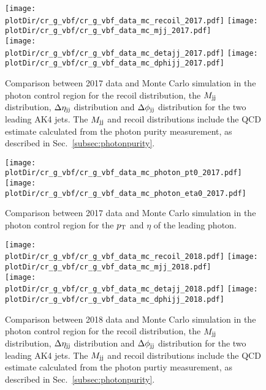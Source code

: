 \begin{figure}[htbp]
    \begin{center}
        \texttt{[image: \\plotDir/cr\_g\_vbf/cr\_g\_vbf\_data\_mc\_recoil\_2017.pdf]}
        \texttt{[image: \\plotDir/cr\_g\_vbf/cr\_g\_vbf\_data\_mc\_mjj\_2017.pdf]} \\
        \texttt{[image: \\plotDir/cr\_g\_vbf/cr\_g\_vbf\_data\_mc\_detajj\_2017.pdf]}
        \texttt{[image: \\plotDir/cr\_g\_vbf/cr\_g\_vbf\_data\_mc\_dphijj\_2017.pdf]}
    \end{center}
    \caption{Comparison between 2017 data and Monte Carlo simulation in the photon control region for
        the recoil distribution, the $M_{\textrm{jj}}$ distribution, $\Delta \eta_{\textrm{jj}}$ distribution and $\Delta \phi_{\textrm{jj}}$ distribution
        for the two leading AK4 jets. The $M_{\textrm{jj}}$ and recoil distributions include the QCD estimate
        calculated from the photon purity measurement, as described in Sec.~\ref{subsec:photonpurity}. }
    \label{fig:Photon_vbfhinv_2017}
\end{figure}

\begin{figure}[htbp]
    \begin{center}
        \texttt{[image: \\plotDir/cr\_g\_vbf/cr\_g\_vbf\_data\_mc\_photon\_pt0\_2017.pdf]}
        \texttt{[image: \\plotDir/cr\_g\_vbf/cr\_g\_vbf\_data\_mc\_photon\_eta0\_2017.pdf]}
    \end{center}
    \caption{Comparison between 2017 data and Monte Carlo simulation in the photon control region for
        the $p_{\textrm{T}}$ and $\eta$ of the leading photon.}
    \label{fig:Photon2_vbfhinv_2017}
\end{figure}

\begin{figure}[htbp]
    \begin{center}
        \texttt{[image: \\plotDir/cr\_g\_vbf/cr\_g\_vbf\_data\_mc\_recoil\_2018.pdf]}
        \texttt{[image: \\plotDir/cr\_g\_vbf/cr\_g\_vbf\_data\_mc\_mjj\_2018.pdf]} \\
        \texttt{[image: \\plotDir/cr\_g\_vbf/cr\_g\_vbf\_data\_mc\_detajj\_2018.pdf]}
        \texttt{[image: \\plotDir/cr\_g\_vbf/cr\_g\_vbf\_data\_mc\_dphijj\_2018.pdf]}
    \end{center}
    \caption{Comparison between 2018 data and Monte Carlo simulation in the photon control region for
        the recoil distribution, the $M_{\textrm{jj}}$ distribution, $\Delta \eta_{\textrm{jj}}$ distribution and $\Delta \phi_{\textrm{jj}}$ distribution
        for the two leading AK4 jets. The $M_{\textrm{jj}}$ and recoil distributions include the QCD estimate
        calculated from the photon purtiy measurement, as described in Sec.~\ref{subsec:photonpurity}. }
    \label{fig:Photon_vbfhinv_2018}
\end{figure}

